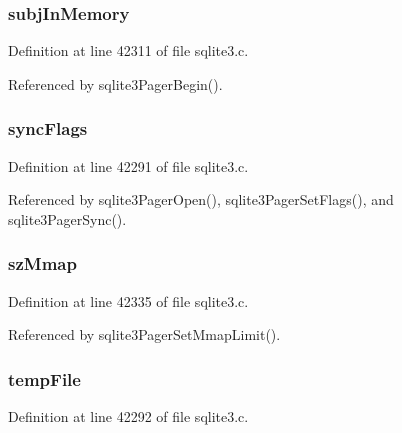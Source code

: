 \subsubsection[{subj\+In\+Memory}]{ subj\+In\+Memory}\label{struct_pager_a94da8b84bf671b4e2a5e63fb11eb4377}


Definition at line 42311 of file sqlite3.\+c.



Referenced by sqlite3\+Pager\+Begin().

\hypertarget{struct_pager_ac97576f0f90c31296207602245d41195}{}
\subsubsection[{sync\+Flags}]{ sync\+Flags}\label{struct_pager_ac97576f0f90c31296207602245d41195}


Definition at line 42291 of file sqlite3.\+c.



Referenced by sqlite3\+Pager\+Open(), sqlite3\+Pager\+Set\+Flags(), and sqlite3\+Pager\+Sync().

\hypertarget{struct_pager_a16be0b65471da845d6b829adf5f17957}{}
\subsubsection[{sz\+Mmap}]{ sz\+Mmap}\label{struct_pager_a16be0b65471da845d6b829adf5f17957}


Definition at line 42335 of file sqlite3.\+c.



Referenced by sqlite3\+Pager\+Set\+Mmap\+Limit().

\hypertarget{struct_pager_a9d9740be8094db2eea335d9dc9bada1b}{}
\subsubsection[{temp\+File}]{ temp\+File}\label{struct_pager_a9d9740be8094db2eea335d9dc9bada1b}


Definition at line 42292 of file sqlite3.\+c.



